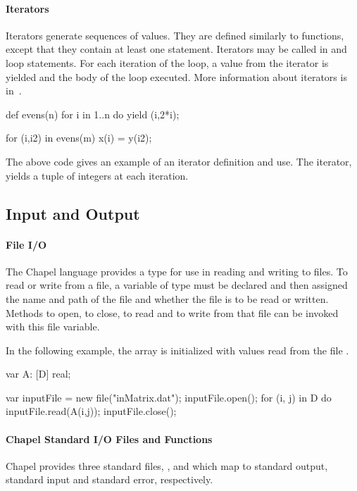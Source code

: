 \paragraph{Iterators}
Iterators generate sequences of values.  They are defined similarly to
functions, except that they contain at least one 
statement.  Iterators may be called in  and 
loop statements.  For each iteration of the loop, a value from the
iterator is yielded and the body of the loop executed.  More
information about iterators is in~.
\begin{example}
\begin{chapel}
def evens(n) {
  for i in 1..n do yield (i,2*i);
}

for (i,i2) in evens(m) {
  x(i) = y(i2);
}
\end{chapel}
The above code gives an example of an iterator definition and use.
The iterator,  yields a tuple of integers at each iteration.
\end{example}

\subsection{Input and Output}
\label{Intro_Input_and_Output}

\paragraph{File I/O}
The Chapel language provides a  type for use in reading and
writing to files.  To read or write from a file, a variable of 
type must be declared and then assigned the name and path of the file 
and whether the file is to be read or written.  Methods to open, to close,
to read and to write from that file can be invoked with this file
variable.

\begin{example}
In the following example, the array  is initialized with
values read from the file .
\begin{chapel}
var A: [D] real;

var inputFile = new file("inMatrix.dat");
inputFile.open();
for (i, j) in D do inputFile.read(A(i,j));
inputFile.close();
\end{chapel}
\end{example}

\paragraph{Chapel Standard I/O Files and Functions}
Chapel provides three standard files, , 
and  which map to standard output, standard input and
standard error, respectively.


